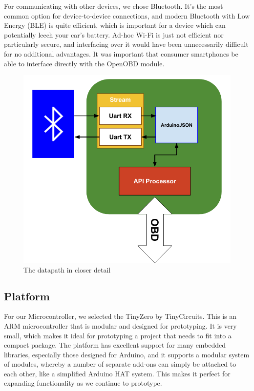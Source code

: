 \documentclass[10pt,letterpaper,unboxed,cm]{article}
\begin{document}
For communicating with other devices, we chose Bluetooth. It's the most common option for device-to-device connections, and modern Bluetooth with Low Energy (BLE) is quite efficient, which is important for a device which can potentially leech your car's battery. Ad-hoc Wi-Fi is just not efficient nor particularly secure, and interfacing over it would have been unnecessarily difficult for no additional advantages. It was important that consumer smartphones be able to interface directly with the OpenOBD module.

\begin{figure}[H]
\begin{center}
\includegraphics[width=0.6\linewidth]{modulePathway.png}
\caption{The datapath in closer detail}
\end{center}
\end{figure}

\subsection{Platform}

For our Microcontroller, we selected the TinyZero by TinyCircuits. This is an ARM microcontroller that is modular and designed for prototyping. It is very small, which makes it ideal for prototyping a project that needs to fit into a compact package. The platform has excellent support for many embedded libraries, especially those designed for Arduino, and it supports a modular system of  modules, whereby a number of separate add-ons can simply be attached to each other, like a simplified Arduino HAT system. This makes it perfect for expanding functionality as we continue to prototype.
\end{document}
